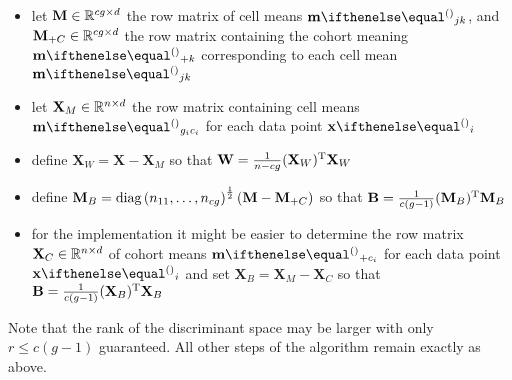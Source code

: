 \documentclass[a4paper]{article}
\begin{document}
\begin{itemize}
\item let $\mathbf{M}\in \mathbb{R}^{cg\times d}$ the row matrix of cell means $\vm_{jk}$, and $\mathbf{M}_{+C} \in \mathbb{R}^{cg\times d}$ the row matrix containing the cohort meaning $\vm_{+k}$ corresponding to each cell mean $\vm_{jk}$
\item let $\mathbf{X}_M\in \mathbb{R}^{n\times d}$ the row matrix containing cell means $\vm_{g_i c_i}$ for each data point $\vx_i$
\item define $\mathbf{X}_W = \mathbf{X} - \mathbf{X}_M$ so that $\mathbf{W} = \frac1{n - cg} (\mathbf{X}_W)^{\text{T}} \mathbf{X}_W$
\item define $\mathbf{M}_B = \mathop{\text{diag}}\left(n_{11}, \ldots, n_{cg}\right)^{\frac12} (\mathbf{M} - \mathbf{M}_{+C})$ so that $\mathbf{B} = \frac{1}{c (g - 1)} (\mathbf{M}_B)^{\text{T}} \mathbf{M}_B$
\item for the implementation it might be easier to determine the row matrix $\mathbf{X}_C\in \mathbb{R}^{n\times d}$ of cohort means $\vm_{+ c_i}$ for each data point $\vx_i$ and set $\mathbf{X}_B = \mathbf{X}_M - \mathbf{X}_C$ so that $\mathbf{B} = \frac{1}{c (g - 1)} (\mathbf{X}_B)^{\text{T}} \mathbf{X}_B$
\end{itemize}

Note that the rank of the discriminant space may be larger with only $r \leq c(g - 1)$ guaranteed.  All other steps of the algorithm remain exactly as above.



\section{}
\label{sec:A}

\subsection{}
\label{sec:A:}


\section{}
\label{sec:B}

\subsection{}
\label{sec:B:}



  

\newpage
\listoftodos
\end{document}
